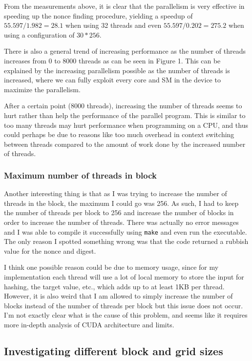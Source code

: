 \documentclass[12pt]{article}
\begin{document}
\bigbreak \noindent From the measurements above, it is clear that the parallelism is very effective in speeding up the nonce finding procedure, yielding a speedup of $55.597/1.982 = 28.1$ when using 32 threads and even $55.597/0.202 = 275.2$ when using a configuration of $30 * 256$.

\bigbreak \noindent There is also a general trend of increasing performance as the number of threads increases from 0 to 8000 threads as can be seen in Figure 1. This can be explained by the increasing parallelism possible as the number of threads is increased, where we can fully exploit every core and SM in the device to  maximize the parallelism.

\bigbreak \noindent After a certain point (8000 threads), increasing the number of threads seems to hurt rather than help the performance of the parallel program. This is similar to too many threads may hurt performance when programming on a CPU, and thus could perhaps be due to reasons like too much overhead in context switching between threads compared to the amount of work done by the increased number of threads.

\subsubsection{Maximum number of threads in block}

\bigbreak \noindent Another interesting thing is that as I was trying to increase the number of threads in the block, the maximum I could go was 256. As such, I had to keep the number of threads per block to 256 and increase the number of blocks in order to increase the number of threads. There was actually no error messages and I was able to compile it successfully using \verb!make! and even run the executable. The only reason I spotted something wrong was that the code returned a rubbish value for the nonce and digest.

\bigbreak \noindent I think one possible reason could be due to memory usage, since for my implementation each thread will use a lot of local memory to store the input for hashing, the target value, etc., which adds up to at least 1KB per thread. However, it is also weird that I am allowed to simply increase the number of blocks instead of the number of threads per block but this issue does not occur. I'm not exactly clear what is the cause of this problem, and seems like it requires more in-depth analysis of CUDA architecture and limits.

\subsection{Investigating different block and grid sizes}
\end{document}
